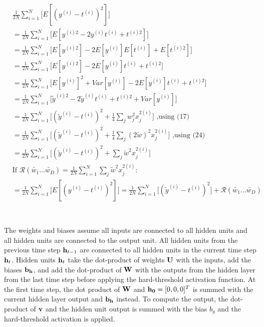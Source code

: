 \documentclass[12pt,letterpaper]{article} %
\newcommand{\sumj}{\sum_j}
\begin{document}
\subsection{}
\begin{align}
&\frac{1}{2N}\sum_{i=1}^N\big[E[(y^{(i)}-t^{(i)})^2] \big]\\
&=\frac{1}{2N}\sum_{i=1}^N\big[E[y^{(i)2}-2y^{(i)}t^{(i)} + t^{(i)2}] \big]\\
&=\frac{1}{2N}\sum_{i=1}^N\big[E[y^{(i) 2}]-2E[y^{(i)}]E[t^{(i)}]+ E[t^{(i) 2}] \big]\\
&=\frac{1}{2N}\sum_{i=1}^N\big[E[y^{(i) 2}]-2E[y^{(i)}]t^{(i)}+ t^{(i) 2} \big]\\
&=\frac{1}{2N}\sum_{i=1}^N\big[E[y^{(i)}]^ 2+Var[y^{(i)}]-2E[y^{(i)}]t^{(i)}+ t^{(i) 2} \big]\\
&=\frac{1}{2N}\sum_{i=1}^N\big[\tilde{y}^{(i) 2}-2\tilde{y}^{(i)}t^{(i)}+ t^{(i) 2} +Var[y^{(i)}] \big]\\
&=\frac{1}{2N}\sum_{i=1}^N\big[(\tilde{y}^{(i)}-t^{(i)})^2 + \frac{1}{4}\sumj w_j^2x_j^{2(i)} \big] \text{  ,using (17)}\\
&=\frac{1}{2N}\sum_{i=1}^N\big[(\tilde{y}^{(i)}-t^{(i)})^2 + \frac{1}{4}\sumj (2\tilde{w})^2x_j^{2(i)} \big]\text{  ,using (24)} \\
&=\frac{1}{2N}\sum_{i=1}^N\big[(\tilde{y}^{(i)}-t^{(i)})^2 + \sumj \tilde{w}^2x_j^{2(i)} \big] \\
&\text{If }\mathcal{R}(\tilde{w_1}...\tilde{w_D}) =\frac{1}{2N}\sum_{i=1}^N \sumj \tilde{w}^2x_j^{2(i)}:\\
&=\frac{1}{2N}\sum_{i=1}^N\big[E[(y^{(i)}-t^{(i)})^2] \big] = \frac{1}{2N}\sum_{i=1}^N\big[(\tilde{y}^{(i)}-t^{(i)})^2\big] + \mathcal{R}(\tilde{w_1}...\tilde{w_D}) \\
\end{align}

\clearpage
\section{}
The weights and biases assume all inputs are connected to all hidden units and all hidden units are connected to the output unit. All hidden units from the previous time step $\bold{h}_{t-1}$ are connected to all hidden units in the current time step $\bold{h}_t$. Hidden units $\bold{h}_t$ take the dot-product of weights $\bold{U}$ with the inputs, add the biases $\bold{b_h}$, and add the dot-product of $\bold{W}$  with the outputs from the hidden layer from the last time step before applying the hard-threshold activation function. At the first time step, the dot product of $\bold{W}$ and $\bold{h_0}=[0,0,0]^T$ is summed with the current hidden layer output and $\bold{b_h}$ instead.  To compute the output, the dot-product of $\bold{v}$ and the hidden unit output is summed with the bias $b_y$ and the hard-threshold activation is applied. 
\end{document}
